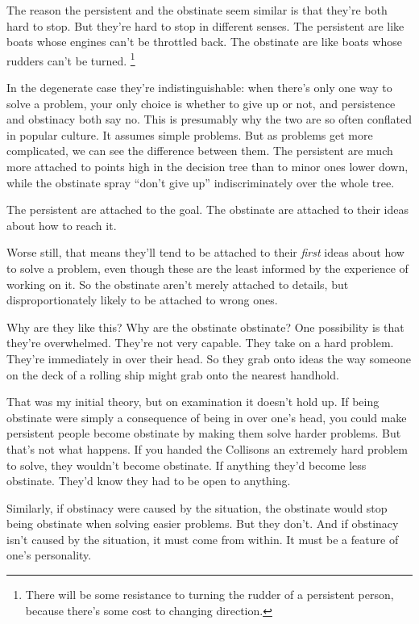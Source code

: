 \documentclass[12pt]{book}
\begin{document}
The reason the persistent and the obstinate seem similar is that they're
both hard to stop. But they're hard to stop in different senses. The
persistent are like boats whose engines can't be throttled back. The
obstinate are like boats whose rudders can't be turned.
\footnote{There will be some resistance to turning the rudder of a
persistent person, because there's some cost to changing direction.}

In the degenerate case they're indistinguishable: when there's only one
way to solve a problem, your only choice is whether to give up or not,
and persistence and obstinacy both say no. This is presumably why the
two are so often conflated in popular culture. It assumes simple
problems. But as problems get more complicated, we can see the
difference between them. The persistent are much more attached to points
high in the decision tree than to minor ones lower down, while the
obstinate spray ``don't give up'' indiscriminately over the whole tree.

The persistent are attached to the goal. The obstinate are attached to
their ideas about how to reach it.

Worse still, that means they'll tend to be attached to their
\emph{first} ideas about how to solve a problem, even though these are
the least informed by the experience of working on it. So the obstinate
aren't merely attached to details, but disproportionately likely to be
attached to wrong ones.

Why are they like this? Why are the obstinate obstinate? One possibility
is that they're overwhelmed. They're not very capable. They take on a
hard problem. They're immediately in over their head. So they grab onto
ideas the way someone on the deck of a rolling ship might grab onto the
nearest handhold.

That was my initial theory, but on examination it doesn't hold up. If
being obstinate were simply a consequence of being in over one's head,
you could make persistent people become obstinate by making them solve
harder problems. But that's not what happens. If you handed the
Collisons an extremely hard problem to solve, they wouldn't become
obstinate. If anything they'd become less obstinate. They'd know they
had to be open to anything.

Similarly, if obstinacy were caused by the situation, the obstinate
would stop being obstinate when solving easier problems. But they don't.
And if obstinacy isn't caused by the situation, it must come from
within. It must be a feature of one's personality.
\end{document}
